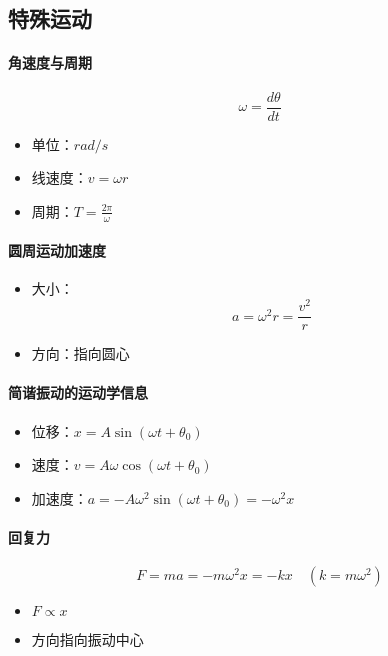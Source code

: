 \subsection{特殊运动}

\paragraph{角速度与周期}
\begin{equation*}
    \omega = \frac{d\theta}{dt}
\end{equation*}
\begin{itemize}
    \item 单位：$rad/s$
    \item 线速度：$v=\omega r$
    \item 周期：$T=\frac{2\pi}{\omega}$
\end{itemize}

\paragraph{圆周运动加速度}
\begin{itemize}
    \item 大小：
    \begin{equation*}
        a=\omega^2r=\frac{v^2}{r}
    \end{equation*}
    \item 方向：指向圆心
\end{itemize}

\paragraph{简谐振动的运动学信息}
\begin{itemize}
    \item 位移：$x=A\sin(\omega t+\theta_0)$
    \item 速度：$v=A\omega\cos(\omega t+\theta_0)$
    \item 加速度：$a=-A\omega^2\sin(\omega t+\theta_0)=-\omega^2x$
\end{itemize}

\paragraph{回复力}
\begin{equation*}
    F=ma=-m\omega^2x=-kx\quad(k=m\omega^2)
\end{equation*}
\begin{itemize}
    \item $F\propto x$
    \item 方向指向振动中心
\end{itemize}

